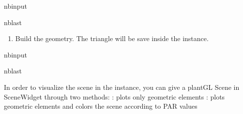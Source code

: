 \documentclass[letterpaper,10pt,english]{sphinxmanual}
\begin{document}
\begin{sphinxuseclass}{nbinput}
\begin{sphinxuseclass}{nblast}
{
\begin{sphinxVerbatim}[commandchars=\\\{\}]
\llap{\color{nbsphinxin}[3]:\,\hspace{\fboxrule}\hspace{\fboxsep}}
  
\end{sphinxVerbatim}
}

\end{sphinxuseclass}
\end{sphinxuseclass}\begin{enumerate}
%
\setcounter{enumi}{1}
\item {} 
\sphinxAtStartPar
Build the geometry. The triangle will be save inside the instance.

\end{enumerate}

\begin{sphinxuseclass}{nbinput}
\begin{sphinxuseclass}{nblast}
{
\begin{sphinxVerbatim}[commandchars=\\\{\}]
\llap{\color{nbsphinxin}[4]:\,\hspace{\fboxrule}\hspace{\fboxsep}}
\end{sphinxVerbatim}
}

\end{sphinxuseclass}
\end{sphinxuseclass}
\sphinxAtStartPar
In order to visualize the scene in the instance, you can give a plantGL Scene in SceneWidget through two methods: \sphinxhyphen{} : plots only geometric elements \sphinxhyphen{} : plots geometric elements and colors the scene according to PAR values
\end{document}
